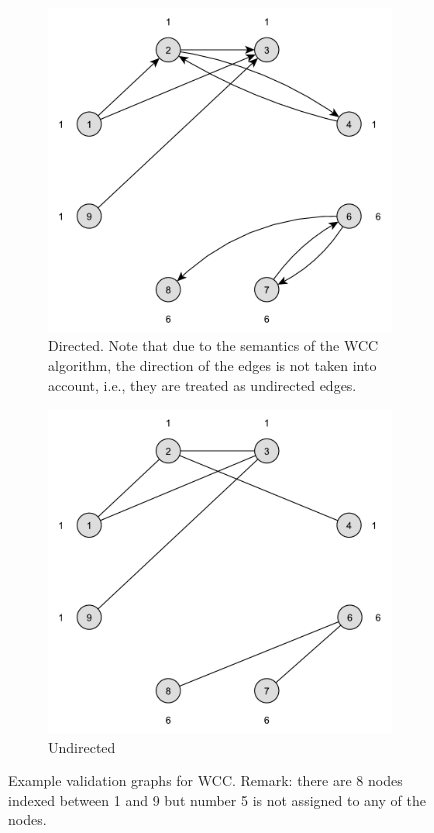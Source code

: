 \begin{figure}[h]
	\centering
	\begin{subfigure}[t]{0.496\textwidth}
		\centering
		\includegraphics[scale=\examplescale]{figures/examples/wcc-dir.pdf}
		\caption{Directed. Note that due to the semantics of the WCC algorithm, the direction of the edges is not taken into account, i.e., they are treated as undirected edges.}
	\end{subfigure}
	\begin{subfigure}[t]{0.496\textwidth}
		\centering
		\includegraphics[scale=\examplescale]{figures/examples/wcc-undir.pdf}
		\caption{Undirected}
	\end{subfigure}
	\caption{Example validation graphs for WCC. Remark: there are 8 nodes indexed between 1 and 9 but number 5 is not assigned to any of the nodes.}
	\label{fig:wcc_example}
\end{figure}

